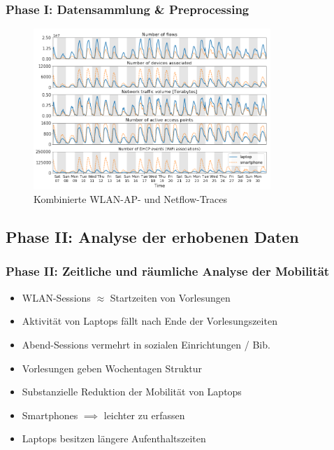 \documentclass{beamer}
\begin{document}
\begin{frame}
  \frametitle{Phase I: Datensammlung \& Preprocessing}
  \begin{figure}
    \centering
    \includegraphics[width=0.8\textwidth]{images/traces.png}
    \caption*{Kombinierte WLAN-AP- und Netflow-Traces}
  \end{figure}  
\end{frame}

\subsection{\textbf{Phase II}: Analyse der erhobenen Daten}

\begin{frame}
  \frametitle{Phase II: Zeitliche und räumliche Analyse der Mobilität}
  \begin{itemize}
    \item WLAN-Sessions $\approx$ Startzeiten von Vorlesungen
    \item Aktivität von Laptops fällt nach Ende der Vorlesungszeiten
    \item Abend-Sessions vermehrt in sozialen Einrichtungen / Bib.
    \item Vorlesungen geben Wochentagen Struktur
    \item Substanzielle Reduktion der Mobilität von Laptops
    \item Smartphones  $\implies$ leichter zu erfassen
    \item Laptops besitzen längere Aufenthaltszeiten 
  \end{itemize}
\end{frame}
\end{document}

